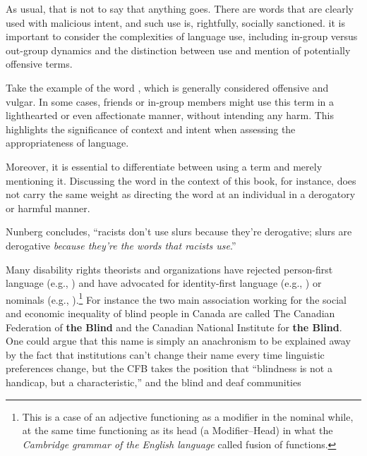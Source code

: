 As usual, that is not to say that anything goes. There are words that are clearly used with malicious intent, and such use is, rightfully, socially sanctioned. it is important to consider the complexities of language use, including in-group versus out-group dynamics and the distinction between use and mention of potentially offensive terms.

Take the example of the word , which is generally considered offensive and vulgar. In some cases, friends or in-group members might use this term in a lighthearted or even affectionate manner, without intending any harm. This highlights the significance of context and intent when assessing the appropriateness of language.

Moreover, it is essential to differentiate between using a term and merely mentioning it. Discussing the word  in the context of this book, for instance, does not carry the same weight as directing the word at an individual in a derogatory or harmful manner.




Nunberg concludes, “racists don't use slurs because they're derogative; slurs are derogative \textit{because they're the words that racists use}.” \citep[244]{Nunberg2018}

Many disability rights theorists and organizations have rejected person-first language (e.g., ) and have advocated for identity-first language (e.g., ) or nominals (e.g., ).\footnote{This is a case of an adjective functioning as a modifier in the nominal while, at the same time functioning as its head (a Modifier–Head) in what the \textit{Cambridge grammar of the English language} called fusion of functions.} For instance the two main association working for the social and economic inequality of blind people in Canada are called The Canadian Federation of \textbf{the Blind} and the Canadian National Institute for \textbf{the Blind}. One could argue that this name is simply an anachronism to be explained away by the fact that institutions can't change their name every time linguistic preferences change, but the CFB takes the position that ``blindness is not a handicap, but a characteristic,'' and the blind and deaf communities

